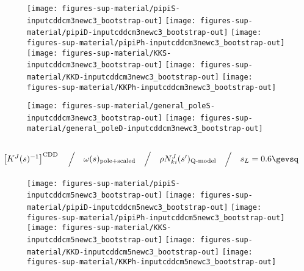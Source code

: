 



\begin{figure}[h]
\centering\texttt{[image: figures-sup-material/pipiS-inputcddcm3newc3\_bootstrap-out]} \texttt{[image: figures-sup-material/pipiD-inputcddcm3newc3\_bootstrap-out]} \texttt{[image: figures-sup-material/pipiPh-inputcddcm3newc3\_bootstrap-out]}
\texttt{[image: figures-sup-material/KKS-inputcddcm3newc3\_bootstrap-out]} \texttt{[image: figures-sup-material/KKD-inputcddcm3newc3\_bootstrap-out]} \texttt{[image: figures-sup-material/KKPh-inputcddcm3newc3\_bootstrap-out]}
\end{figure}

\begin{figure}[h]
\centering\texttt{[image: figures-sup-material/general\_poleS-inputcddcm3newc3\_bootstrap-out]} \texttt{[image: figures-sup-material/general\_poleD-inputcddcm3newc3\_bootstrap-out]}
\end{figure}



\clearpage

\subsection{$\left[K^J(s)^{-1}\right]^\text{CDD} \quad\Big/\quad \omega(s)_\text{pole+scaled} \quad\Big/\quad \rho N^J_{ki}(s')_\text{Q-model} \quad\Big/\quad s_L = 0.6\gevsq$}
\label{subsec:inputcddcm5newc3_bootstrap-out}






\begin{figure}[h]
\centering\texttt{[image: figures-sup-material/pipiS-inputcddcm5newc3\_bootstrap-out]} \texttt{[image: figures-sup-material/pipiD-inputcddcm5newc3\_bootstrap-out]} \texttt{[image: figures-sup-material/pipiPh-inputcddcm5newc3\_bootstrap-out]}
\texttt{[image: figures-sup-material/KKS-inputcddcm5newc3\_bootstrap-out]} \texttt{[image: figures-sup-material/KKD-inputcddcm5newc3\_bootstrap-out]} \texttt{[image: figures-sup-material/KKPh-inputcddcm5newc3\_bootstrap-out]}
\end{figure}

